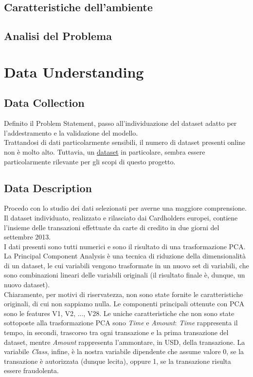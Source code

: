 \documentclass[]{article}
\begin{document}
    \subsection{Caratteristiche dell'ambiente}

    \subsection{Analisi del Problema}

\section{Data Understanding}
    \subsection{Data Collection}
        Definito il Problem Statement, passo all'individuazione del dataset adatto per l'addestramento e la validazione del modello.\\
        Trattandosi di dati particolarmente sensibili, il numero di dataset presenti online non è molto alto. Tuttavia, un \href{https://www.kaggle.com/datasets/mlg-ulb/creditcardfraud}{dataset} in particolare, sembra essere particolarmente rilevante per gli scopi di questo progetto.

    \subsection{Data Description}
        Procedo con lo studio dei dati selezionati per averne una maggiore comprensione. Il dataset individuato, realizzato e rilasciato dai Cardholders europei, contiene l'insieme delle transazioni effettuate da carte di credito in due giorni del settembre 2013.\\
        I dati presenti sono tutti numerici e sono il risultato di una trasformazione PCA. La Principal Component Analysis è una tecnica di riduzione della dimensionalità di un dataset, le cui variabili vengono trasformate in un nuovo set di variabili, che sono combinazioni lineari delle variabili originali (il risultato finale è, dunque, un nuovo dataset).\\
        Chiaramente, per motivi di riservatezza, non sono state fornite le caratteristiche originali, di cui non sappiamo nulla. Le componenti principali ottenute con PCA sono le features V1, V2, ..., V28. Le uniche caratteristiche che non sono state sottoposte alla trasformazione PCA sono \textit{Time} e \textit{Amount}: \textit{Time} rappresenta il tempo, in secondi, trascorso tra ogni transazione e la prima transazione del dataset, mentre \textit{Amount} rappresenta l'ammontare, in USD, della transazione. La variabile \textit{Class}, infine, è la nostra variabile dipendente che assume valore 0, se la transazione è autorizzata (dunque lecita), oppure 1, se la transazione risulta essere fraudolenta.\\
\end{document}
